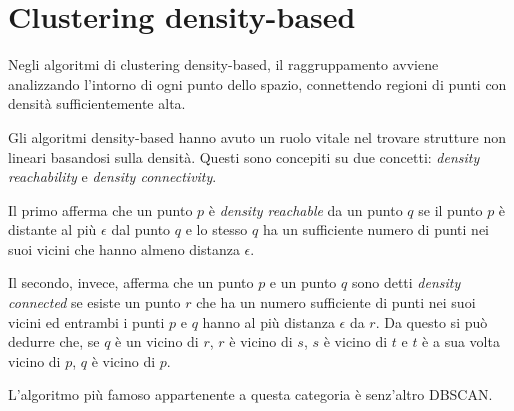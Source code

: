 \section{Clustering density-based}
	Negli algoritmi di clustering density-based, il raggruppamento avviene analizzando l'intorno di ogni punto dello spazio, connettendo regioni di punti con densità sufficientemente alta\cite{Density_based_clustering}.
		
	Gli algoritmi density-based hanno avuto un ruolo vitale nel trovare strutture non lineari basandosi sulla densità. Questi sono concepiti su due concetti: \emph{density reachability} e \emph{density connectivity}.

	Il primo afferma che un punto $p$ è \emph{density reachable} da un punto $q$ se il punto $p$ è distante al più $\epsilon$ dal punto $q$ e lo stesso $q$ ha un sufficiente numero di punti nei suoi vicini che hanno almeno distanza $\epsilon$\cite{density_based_concept}. 

	Il secondo, invece, afferma che un punto $p$ e un punto $q$ sono detti \emph{density connected} se esiste un punto $r$ che ha un numero sufficiente di punti nei suoi vicini ed entrambi i punti $p$ e $q$ hanno al più distanza $\epsilon$ da $r$. Da questo si può dedurre che, se $q$ è un vicino di $r$, $r$ è vicino di $s$, $s$ è vicino di $t$ e $t$ è a sua volta vicino di $p$, $q$ è vicino di $p$\cite{density_based_concept}.

	L'algoritmo più famoso appartenente a questa categoria è senz'altro DBSCAN.
